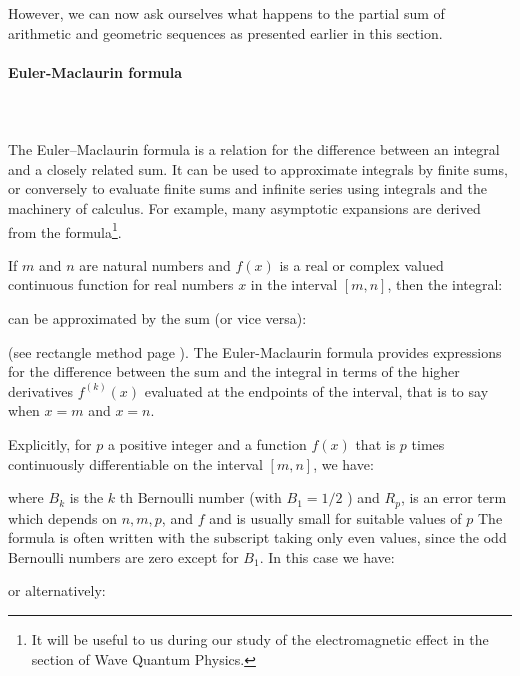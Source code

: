 	However, we can now ask ourselves what happens to the partial sum of arithmetic and geometric sequences as presented earlier in this section. 
	
	\paragraph{Euler-Maclaurin formula}\label{Euler-MacLaurin formula}\mbox{}\\\\
	The Euler–Maclaurin formula is a relation for the difference between an integral and a closely related sum. It can be used to approximate integrals by finite sums, or conversely to evaluate finite sums and infinite series using integrals and the machinery of calculus. For example, many asymptotic expansions are derived from the formula\footnote{It will be useful to us during our study of the electromagnetic effect in the section of Wave Quantum Physics.}.
	
	If $m$ and $n$ are natural numbers and $f(x)$ is a real or complex valued continuous function for real numbers $x$ in the interval $[m, n]$, then the integral:
	
	can be approximated by the sum (or vice versa):
	
	(see rectangle method page \pageref{rectangle integration method}). The Euler-Maclaurin formula provides expressions for the difference between the sum and the integral in terms of the higher derivatives $f^{(k)}(x)$ evaluated at the endpoints of the interval, that is to say when $x=m$ and $x=n$.
	
	Explicitly, for $p$ a positive integer and a function $f(x)$ that is $p$ times continuously differentiable on the interval $[m, n]$, we have:
	
	where $B_{k}$ is the $k$ th Bernoulli number (with $B_{1}=1 / 2$ ) and $R_{p}$, is an error term which depends on $n, m, p$, and $f$ and is usually small for suitable values of $p$ The formula is often written with the subscript taking only even values, since the odd Bernoulli numbers are zero except for $B_{1}$. In this case we have:
	
	or alternatively:
	
